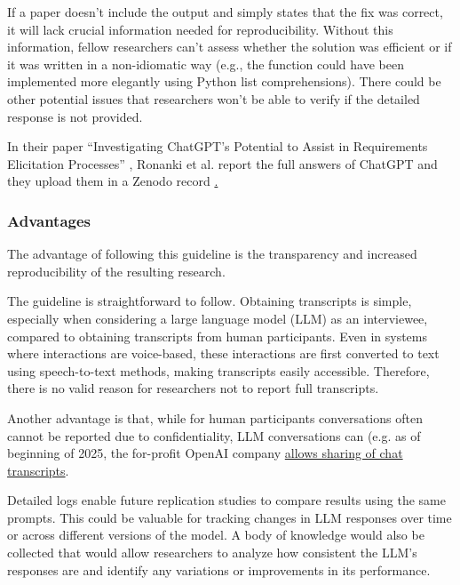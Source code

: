 If a paper doesn't include the output and simply states that the fix was correct, it will lack crucial information needed for reproducibility. Without this information, fellow researchers can't assess whether the solution was efficient or if it was written in a non-idiomatic way (e.g., the function could have been implemented more elegantly using Python list comprehensions). There could be other potential issues that researchers won't be able to verify if the detailed response is not provided.


In their paper ``Investigating ChatGPT's Potential to Assist in Requirements Elicitation Processes'' \cite{ronanki2023investigating}, Ronanki et al. report the full answers of ChatGPT and they upload them in a Zenodo record \href{https://zenodo.org/records/8124936}. 



\subsubsection{Advantages}

The advantage of following this guideline is the transparency and increased reproducibility of the resulting research. 

The guideline is straightforward to follow. Obtaining transcripts is simple, especially when considering a large language model (LLM) as an interviewee, compared to obtaining transcripts from human participants. Even in systems where interactions are voice-based, these interactions are first converted to text using speech-to-text methods, making transcripts easily accessible. Therefore, there is no valid reason for researchers not to report full transcripts.

Another advantage is that, while for human participants conversations often cannot be reported due to confidentiality, LLM conversations can (e.g. as of beginning of 2025, the for-profit OpenAI company \href{https://openai.com/policies/sharing-publication-policy/}{allows sharing of chat transcripts}.

Detailed logs enable future replication studies to compare results using the same prompts. This could be valuable for tracking changes in LLM responses over time or across different versions of the model. A body of knowledge would also be collected that would allow researchers to analyze how consistent the LLM's responses are and identify any variations or improvements in its performance.



